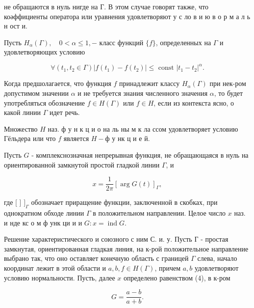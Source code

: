\documentclass[10pt]{article}
\begin{document}
не обращаются в нуль нигде на Г. В этом случае говорят также, что коәффициенты оператора или уравнения удовлетворяют у с ло в и ю в о р м а л ь н ост и.



Пусть $H_{\alpha}(\Gamma), \quad 0<\alpha \leqslant 1,-$ класс функций $\{f\}$, определенных на $\Gamma$ и удовлетворяющих условию



\[

\forall\left(t_{1}, t_{2} \in \Gamma\right)\left|f\left(t_{1}\right)-f\left(t_{2}\right)\right| \leqslant \text { const }\left|t_{1}-t_{2}\right|^{\alpha} .

\]



Когда предшолагается, что функция $f$ принадлежит классу $H_{\alpha}(\Gamma)$ при нек-ром допустимом значении $\alpha$ и не требуется знания численного значения $\alpha$, то будет употребляться обозначение $f \in H(\Gamma)$ или $f \in H$, если из контекста ясно, о какой линии $\Gamma$ идет речь.



Множество $H$ наз. ф у н к ц и о на ль ны м к ла ссом удовлетворяет условию Гёльдера или что $f$ является $H-ф$ у нк ц и е й.



Пусть $G$ - комплекснозначная непрерывная функция, не обращающаяся в нуль на ориентированной замкнутой простой гладкой линии $\Gamma$, и



\[

x=\frac{1}{2 \pi}[\arg G(t)]_{\Gamma},

\]



где [ ] $]_{\Gamma}$ обозначает приращение функции, заключенной в скобках, при однократном обходе линии $\Gamma$ в положительном направлении. Целое число $x$ наз. и нде кс о м ф унк ци и и $G: x=\operatorname{ind} G$.



Решение характеристического и союзного с ним С. и. у. Пусть Г - простая замкнутая, ориентированная гладкая линия, на к-рой положительное направление выбрано так, что оно оставляет конечную область с границей $\Gamma$ слева, начало координат лежит в этой области и $a, b, f \in H(\Gamma)$, причем $a, b$ удовлетворяют условию нормальности. Пусть, далее $x$ определено равенством (4), в к-ром



\[

G=\frac{a-b}{a+b} .

\]
\end{document}

